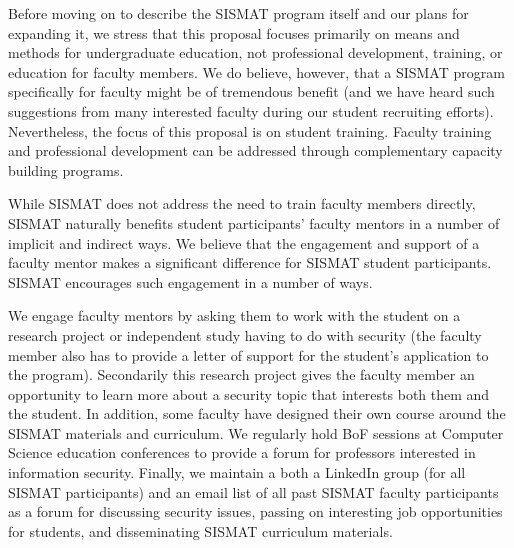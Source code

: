 Before moving on to describe the SISMAT program itself and our plans
for expanding it, we stress that this proposal focuses primarily on
means and methods for undergraduate education, not professional
development, training, or education for faculty members.  We do
believe, however, that a SISMAT program specifically for faculty might
be of tremendous benefit (and we have heard such suggestions from many
interested faculty during our student recruiting efforts).
Nevertheless, the focus of this proposal is on student training.
Faculty training and professional development can be addressed through
complementary capacity building programs.

While SISMAT does not address the need to train faculty members
directly, SISMAT naturally benefits student participants' faculty
mentors in a number of implicit and indirect ways.  We believe that
the engagement and support of a faculty mentor makes a significant
difference for SISMAT student participants.  SISMAT encourages such
engagement in a number of ways.

We engage faculty mentors by asking them to work with the student on a
research project or independent study having to do with security (the
faculty member also has to provide a letter of support for the
student's application to the program).  Secondarily this research
project gives the faculty member an opportunity to learn more about a
security topic that interests both them and the student.  In addition,
some faculty have designed their own course around the SISMAT
materials and curriculum.  We regularly hold BoF sessions at Computer
Science education conferences to provide a forum for professors
interested in information security.  Finally, we maintain a both a
LinkedIn group (for all SISMAT participants) and an email list of all
past SISMAT faculty participants as a forum for discussing security
issues, passing on interesting job opportunities for students, and
disseminating SISMAT curriculum materials.
